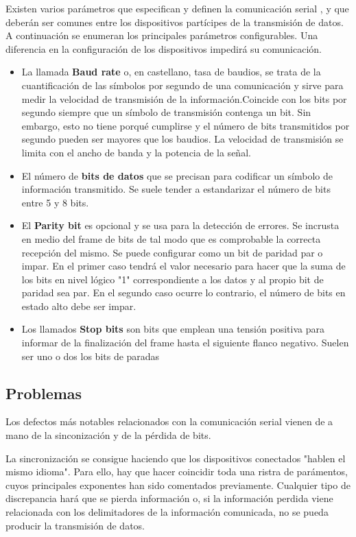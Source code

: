 Existen varios parámetros que especifican y definen la comunicación serial \cite{NI:2004}, y que deberán ser comunes entre los dispositivos partícipes de la transmisión de datos. A continuación se enumeran los principales parámetros configurables. Una diferencia en la configuración de los dispositivos impedirá su comunicación.

\begin{itemize}
\item La llamada \textbf{Baud rate} o, en castellano, tasa de baudios, se trata de la cuantificación de las símbolos por segundo de una comunicación y sirve para medir la velocidad de transmisión de la información.Coincide con los bits por segundo siempre que un símbolo de transmisión contenga un bit. Sin embargo, esto no tiene porqué cumplirse y el número de bits transmitidos por segundo pueden ser mayores que los baudios. La velocidad de transmisión se limita con el ancho de banda y la potencia de la señal.
\item El número de \textbf{bits de datos} que se precisan para codificar un símbolo de información transmitido. Se suele tender a estandarizar el número de bits entre 5 y 8 bits. 
\item El \textbf{Parity bit} es opcional y se usa para la detección de errores. Se incrusta en medio del frame de bits de tal modo que es comprobable la correcta recepción del mismo. Se puede configurar como un bit de paridad par o impar. En el primer caso tendrá el valor necesario para hacer que la suma de los bits en nivel lógico "1" correspondiente a los datos y al propio bit de paridad sea par. En el segundo caso ocurre lo contrario, el número de bits en estado alto debe ser impar.
\item Los llamados \textbf{Stop bits} son bits que emplean una tensión positiva para informar de la finalización del frame hasta el siguiente flanco negativo. Suelen ser uno o dos los bits de paradas
\end{itemize}

\subsection{Problemas}

Los defectos más notables relacionados con la comunicación serial vienen de a mano de la sinconización y de la pérdida de bits.

La sincronización se consigue haciendo que los dispositivos conectados "hablen el mismo idioma". Para ello, hay que hacer coincidir toda una ristra de parámentos, cuyos principales exponentes han sido comentados previamente. Cualquier tipo de discrepancia hará que se pierda información o, si la información perdida viene relacionada con los delimitadores de la información comunicada, no se pueda producir la transmisión de datos.

